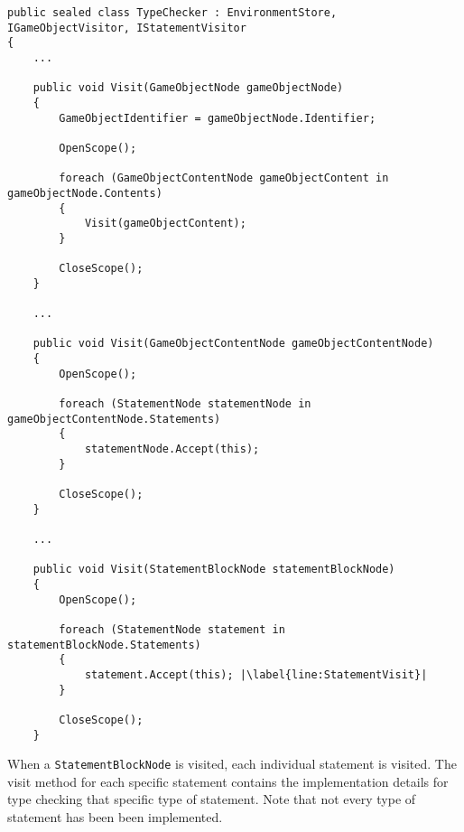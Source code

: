 \begin{lstlisting}[language=CSharp, caption={Applying Scope to \texttt{GameObjectNodes}, \texttt{GameObjectContents} and \texttt{StatementBlocks}.}, label={lst:ApplyScope},escapechar=|]
public sealed class TypeChecker : EnvironmentStore, IGameObjectVisitor, IStatementVisitor
{
    ...

    public void Visit(GameObjectNode gameObjectNode)
    {
        GameObjectIdentifier = gameObjectNode.Identifier;

        OpenScope();

        foreach (GameObjectContentNode gameObjectContent in gameObjectNode.Contents) 
        {
            Visit(gameObjectContent);
        }

        CloseScope();
    }

    ...

    public void Visit(GameObjectContentNode gameObjectContentNode)
    {
        OpenScope();

        foreach (StatementNode statementNode in gameObjectContentNode.Statements)
        {
            statementNode.Accept(this);
        }

        CloseScope();
    }

    ... 

    public void Visit(StatementBlockNode statementBlockNode)
    {
        OpenScope();

        foreach (StatementNode statement in statementBlockNode.Statements) 
        {
            statement.Accept(this); |\label{line:StatementVisit}|
        }
        
        CloseScope();
    }
\end{lstlisting}

When a \texttt{StatementBlockNode} is visited, each individual statement is visited. The visit method for each specific statement contains the implementation details for type checking that specific type of statement. Note that not every type of statement has been been implemented.

